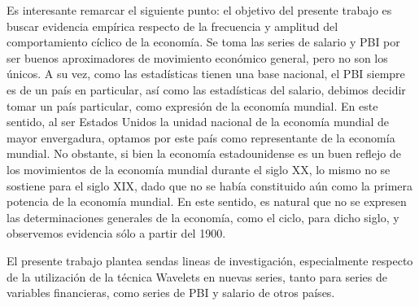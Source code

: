 \documentclass[a4paper]{article}
\begin{document}
Es interesante remarcar el siguiente punto: el objetivo del presente trabajo es buscar evidencia empírica respecto de la frecuencia y amplitud del comportamiento cíclico de la economía. Se toma las series de salario y PBI por ser buenos aproximadores de movimiento económico general, pero no son los únicos. A su vez, como las estadísticas tienen una base nacional, el PBI siempre es de un país en particular, así como las estadísticas del salario, debimos decidir tomar un país particular, como expresión de la economía mundial. En este sentido, al ser Estados Unidos la unidad nacional de la economía mundial de mayor envergadura, optamos por este país como representante de la economía mundial. No obstante, si bien la economía estadounidense es un buen reflejo de los movimientos de la economía mundial durante el siglo XX, lo mismo no se sostiene para el siglo XIX, dado que no se había constituido aún como la primera potencia de la economía mundial. En este sentido, es natural que no se expresen las determinaciones generales de la economía, como el ciclo, para dicho siglo, y observemos evidencia sólo a partir del 1900.

El presente trabajo plantea sendas lineas de investigación, especialmente respecto de la utilización de la técnica Wavelets en nuevas series, tanto para series de variables financieras, como series de PBI y salario de otros países.


\end{document}
